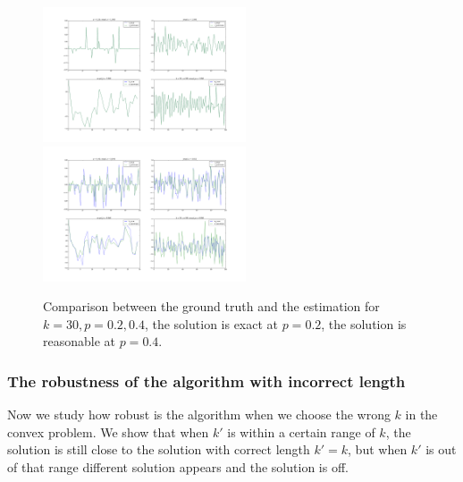 \documentclass[letter, 10pt]{article}
\numberwithin{equation}{section}
\begin{document}
\begin{figure}
\includegraphics[width=6cm,keepaspectratio]{fig2/bShort_k_lenKnown_xSparse_w_Gaus_AGauss_n100_k30_p0_20_sigma0_00.png}
 \includegraphics[width=6cm,keepaspectratio]{fig2/bShort_k_lenKnown_xSparse_w_Gaus_AGauss_n100_k30_p0_40_sigma0_00.png}
\caption{Comparison between the ground truth and the estimation for $k=30, p=0.2, 0.4$, the solution is exact at $p=0.2$, the solution is reasonable at $p=0.4$.  }
\end{figure}

\subsubsection{The robustness of the algorithm with incorrect length}
Now we study how robust is the algorithm when we choose the wrong $k$ in the convex problem. We show that when $k'$ is within a certain range of $k$, the solution is still close to the solution with correct length $k'=k$, but when $k'$ is out of that range different solution appears and the solution is off. 
\end{document}

